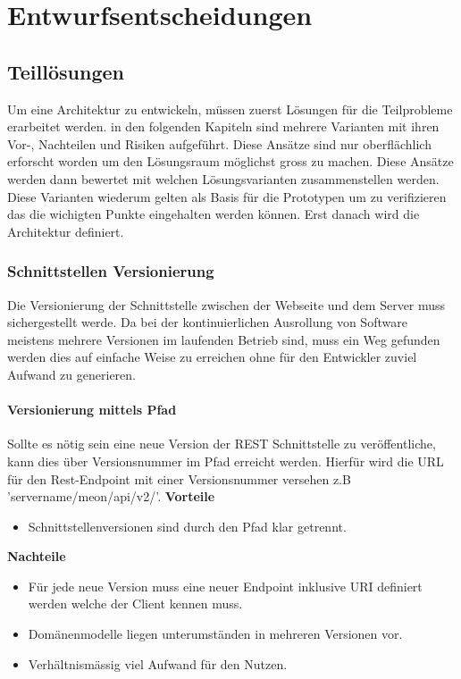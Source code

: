 
\chapter{Entwurfsentscheidungen}
\label{entwurfsentscheidungen}
\section{Teillösungen}

Um eine Architektur zu entwickeln, müssen zuerst Lösungen für die Teilprobleme erarbeitet werden. in den folgenden Kapiteln sind mehrere Varianten mit ihren Vor-, Nachteilen und Risiken aufgeführt. Diese Ansätze sind nur oberflächlich erforscht worden um den Lösungsraum möglichst gross zu machen. Diese Ansätze werden dann bewertet mit welchen Lösungsvarianten zusammenstellen werden. Diese Varianten wiederum gelten als Basis für die Prototypen um zu verifizieren das die wichigten Punkte eingehalten werden können. Erst danach wird die Architektur definiert.

\subsection{Schnittstellen Versionierung}

Die Versionierung der Schnittstelle zwischen der Webseite und dem Server muss sichergestellt werde. Da bei der kontinuierlichen Ausrollung von Software meistens mehrere Versionen im laufenden Betrieb sind, muss ein Weg gefunden werden dies auf einfache Weise zu erreichen ohne für den Entwickler zuviel Aufwand zu generieren.

\subsubsection{Versionierung mittels Pfad}

Sollte es nötig sein eine neue Version der \Gls{REST} Schnittstelle zu veröffentliche, kann dies über Versionsnummer im Pfad erreicht werden. Hierfür wird die URL für den Rest-Endpoint mit einer Versionsnummer versehen z.B 'servername/meon/api/v2/'.
\newline
\newline
\textbf{Vorteile}
\begin{itemize}
	\item Schnittstellenversionen sind durch den Pfad klar getrennt.
\end{itemize}
\textbf{Nachteile}
\begin{itemize}
	\item Für jede neue Version muss eine neuer Endpoint inklusive URI definiert werden welche der Client kennen muss.
	\item Domänenmodelle liegen unterumständen in mehreren Versionen vor.
	\item Verhältnismässig viel Aufwand für den Nutzen.
\end{itemize}

